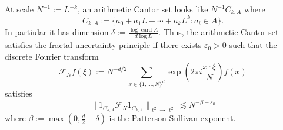 \documentclass[reqno,12pt]{amsart}
\DeclareMathOperator{\card}{card}
\theoremstyle{definition}
\numberwithin{equation}{section}
\begin{document}
At scale $N^{-1} := L^{-k}$, an arithmetic Cantor set looks like $N^{-1} C_{k, A}$ where 
$$C_{k, A} := \{a_0 + a_1 L + \cdots + a_k L^k: a_i \in A\}.$$
In partiular it has dimension $\delta := \frac{\log \card A}{d \log L}$.
Thus, the arithmetic Cantor set satisfies the fractal uncertainty principle if there exists $\varepsilon_0 > 0$ such that the discrete Fourier transform 
$$\mathcal F_N f(\xi) := N^{-d/2} \sum_{x \in \{1, \dots, N\}^d} \exp\left(2\pi i\frac{x \cdot \xi}{N}\right) f(x)$$
satisfies 
\begin{equation}\label{discrete FUP}
    \|1_{C_{k, A}} \mathcal F_N 1_{C_{k, A}}\|_{\ell^2 \to \ell^2} \lesssim N^{-\beta - \varepsilon_0}
\end{equation}
where $\beta := \max(0, \frac{d}{2} - \delta)$ is the Patterson-Sullivan exponent.
\end{document}
